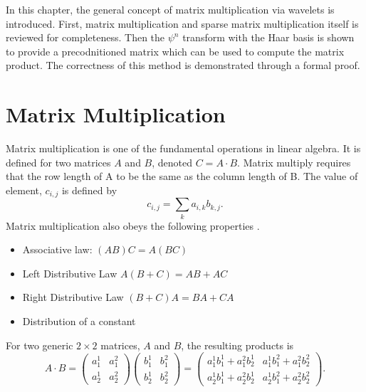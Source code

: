 


%

In this chapter, the general concept of matrix multiplication via
wavelets is introduced. First, matrix multiplication and sparse matrix
multiplication itself is reviewed for completeness.  Then the $\psi^n$
transform with the Haar basis is shown to provide a precodnitioned
matrix which can be used to compute the matrix product. The correctness
of this method is demonstrated through a formal proof.

\section{Matrix Multiplication}

Matrix multiplication is one of the fundamental operations in linear algebra.  It is defined for two matrices $A$ and $B$, denoted $C = A\cdot B$.  Matrix multiply requires that the row length of A to be the same as the column length of B.  The value of element, $c_{i,j}$ is defined by
\[
c_{i,j} = \sum\limits_k a_{i,k} b_{k,j}.
\]
Matrix multiplication also obeys the following properties \cite{lipschutz}.
\begin{itemize}
\item Associative law:  $(AB)C = A(BC)$
\item Left Distributive Law $A (B+C) = AB + AC$
\item Right Distributive Law $(B+C)A = BA + CA$
\item Distribution of a constant
\end{itemize} 
For two generic $2 \times 2$ matrices, $A$ and $B$, the resulting products is
\begin{equation}\displaystyle
\label{eqn:conventional}
A \cdot B = 
\left(\begin{array}{cc}  a^1_1&  a^2_1 \\ a^1_2 &  a^2_2 \end{array}\right)
\left(\begin{array}{cc}  b^1_1&  b^2_1 \\ b^1_2 &  b^2_2 \end{array}\right) =
\left(\begin{array}{cc}  a^1_{1} b^1_{1} + a^2_{1} b^1_{2}&  a^1_{1}b^2_{1} + a^2_{1}  b^2_{2}    \\ a^1_{2} b^1_{1} + a^2_{2} b^1_{2} &  a^1_{2} b^2_{1} + a^2_{2} b^2_{2} 
\end{array}\right).
\end{equation}



